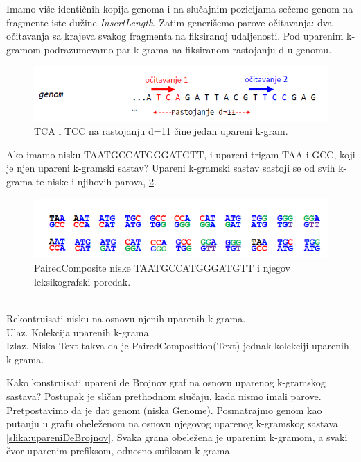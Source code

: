 Imamo više identičnih kopija genoma i na slučajnim pozicijama sečemo genom na fragmente iste dužine \textit{InsertLength}. Zatim generišemo parove očitavanja: dva očitavanja sa krajeva svakog fragmenta na fiksiranoj udaljenosti.
Pod uparenim k-gramom podrazumevamo par k-grama na fiksiranom rastojanju d u genomu.

\begin{figure}[H]
	\centering
	\includegraphics[width=1\textwidth]{poglavlja/3/slike/upareni_kgram.png}
	\caption{TCA i TCC na rastojanju d=11 čine jedan upareni k-gram.}
	\label{slika:upareni}
\end{figure} 

Ako imamo nisku TAATGCCATGGGATGTT, i upareni trigam TAA i GCC, koji je njen upareni k-gramski sastav? Upareni k-gramski sastav sastoji se od svih k-grama te niske i njihovih parova, \ref{slika:upareni3}.


\begin{figure}[H]
	\centering
	\includegraphics[width=1\textwidth]{poglavlja/3/slike/upareni_3gram.png}
	\caption{PairedComposite niske TAATGCCATGGGATGTT i njegov leksikografski poredak.}
	\label{slika:upareni3}
\end{figure} 


\begin{problem} 
	~\\ Rekontruisati nisku na osnovu njenih uparenih k-grama.
	\\ Ulaz. Kolekcija uparenih k-grama.
	\\ Izlaz. Niska Text takva da je PairedComposition(Text) jednak kolekciji uparenih k-grama. 
\end{problem}

Kako konstruisati upareni de Brojnov graf na osnovu uparenog k-gramskog sastava? Postupak je sličan prethodnom slučaju, kada nismo imali parove. Pretpostavimo da je dat genom (niska Genome). Posmatrajmo genom kao putanju u grafu obeleženom na osnovu njegovog uparenog k-gramskog sastava \ref{slika:upareniDeBrojnov}. Svaka grana obeležena je uparenim k-gramom, a svaki čvor uparenim prefiksom, odnosno sufiksom k-grama.


